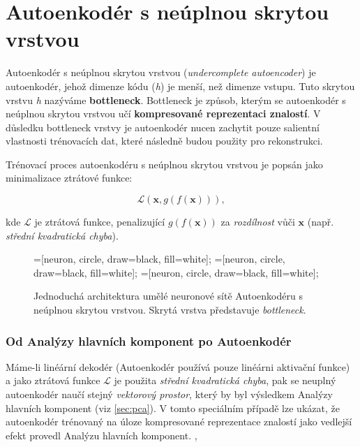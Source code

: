 \section{Autoenkodér s neúplnou skrytou vrstvou}
\label{sec:undercomplete_autoencoder}
Autoenkodér s neúplnou skrytou vrstvou (\emph{undercomplete autoencoder}) je autoenkodér, jehož dimenze kódu (\emph{h}) je menší, než dimenze vstupu.
Tuto skrytou vrstvu \emph{h} nazýváme \textbf{bottleneck}. Bottleneck je způsob, kterým se autoenkodér s neúplnou skrytou vrstvou učí \textbf{kompresované reprezentaci znalostí}. 
V důsledku bottleneck vrstvy je autoenkodér nucen zachytit pouze salientní vlastnosti trénovacích dat, které následně budou použity pro rekonstrukci. \cite{Goodfellow2016}

Trénovací proces autoenkodéru s neúplnou skrytou vrstvou je popsán jako minimalizace ztrátové funkce:

\begin{equation}
    \mathcal{L}(\mathbf{x}, g(f(\mathbf{x}))),
\end{equation}

kde $\mathcal{L}$ je ztrátová funkce, penalizující $g(f(\mathbf{x}))$ za \emph{rozdílnost} vůči $\mathbf{x}$ (např. \emph{střední kvadratická chyba}). \cite{Charte2018}


\begin{figure}[H]
    \centering
    \begin{neuralnetwork}[height=4]
        =[neuron, circle, draw=black, fill=white];
        =[neuron, circle, draw=black, fill=white];
        =[neuron, circle, draw=black, fill=white];
      
      
      
        \hiddenlayer[count=2, bias=false, title=Kód $\emph{h}$]
        \linklayers
      
        \outputlayer[count=4, title=Dekodér, text=\xout]
        \linklayers
      
      \end{neuralnetwork}
    \caption{Jednoduchá architektura umělé neuronové sítě Autoenkodéru s neúplnou skrytou vrstvou. Skrytá vrstva představuje \emph{bottleneck}.}
    \label{fig:autoencoder_bottleneck}
\end{figure}
\subsubsection{Od Analýzy hlavních komponent po Autoenkodér}
Máme-li linéární dekodér (Autoenkodér používá pouze linéárni aktivační funkce) a jako ztrátová funkce $\mathcal{L}$ je použita \emph{střední kvadratická chyba},
pak se neuplný autoenkodér naučí stejný \emph{vektorový prostor}, který by byl výsledkem Analýzy hlavních komponent (viz \autoref{sec:pca}).
V tomto speciálním případě lze ukázat, že autoenkodér trénovaný na úloze kompresované reprezentace znalostí jako vedlejší efekt provedl Analýzu hlavních komponent. \cite{Baldi1989}, \cite{Kamyshanska2013}

